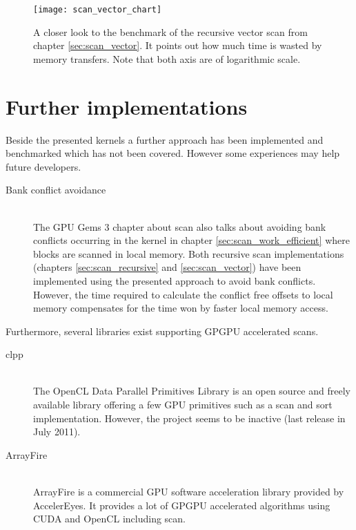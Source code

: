 \begin{figure}
\centering
\texttt{[image: scan\_vector\_chart]}
\caption{A closer look to the benchmark of the recursive vector scan from chapter \ref{sec:scan_vector}. It points out how much time is wasted by memory transfers.
Note that both axis are of logarithmic scale. }
\label{fig:scan_mem_transfer_chart}
\end{figure}

\section{Further implementations}
Beside the presented kernels a further approach has been implemented and benchmarked which has not been covered. However some experiences may help future developers.

\begin{description}
	\item[Bank conflict avoidance] \hfill \\
	The GPU Gems 3 chapter about scan \cite{gpu_gems_3_chapter_39} also talks about avoiding bank conflicts occurring in the kernel in chapter \ref{sec:scan_work_efficient} where blocks are scanned in local memory. Both recursive scan implementations (chapters \ref{sec:scan_recursive} and \ref{sec:scan_vector}) have been implemented using the presented approach to avoid bank conflicts. However, the time required to calculate the conflict free offsets to local memory compensates for the time won by faster local memory access.
\end{description}

Furthermore, several libraries exist supporting GPGPU accelerated scans.

\begin{description}
   \item[clpp \cite{clpp}] \hfill \\
   The OpenCL Data Parallel Primitives Library is an open source and freely available library offering a few GPU primitives such as a scan and sort implementation. However, the project seems to be inactive (last release in July 2011).
   \item[ArrayFire \cite{arrayfire}] \hfill \\
   ArrayFire is a commercial GPU software acceleration library provided by AccelerEyes. It provides a lot of GPGPU accelerated algorithms using CUDA and OpenCL including scan.
\end{description}

